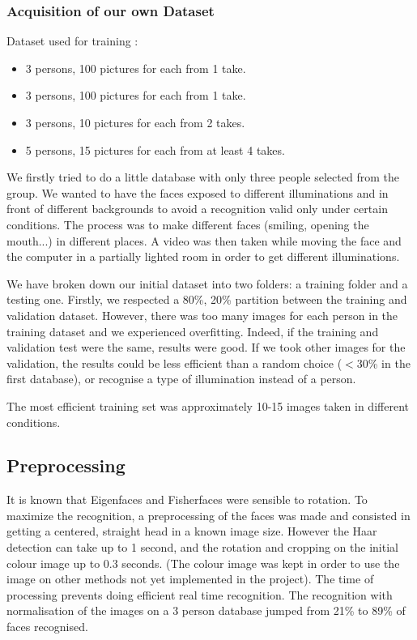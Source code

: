 \subsubsection{Acquisition of our own Dataset}
Dataset used for training :
\begin{itemize}
 \item 3 persons, 100 pictures for each from 1 take.  
\item 3 persons, 100 pictures for each from 1 take.
\item 3 persons, 10 pictures for each from 2 takes.
\item 5 persons, 15 pictures for each from at least 4 takes.
\end{itemize}
We firstly tried to do a little database with only three people selected from the group. We wanted to have the faces exposed to different illuminations and in front of different backgrounds to avoid a recognition valid only under certain conditions. The process was to make different faces (smiling, opening the mouth...) in different places. A video was then taken while moving the face and the computer in a partially lighted room in order to get different illuminations. 

We have broken down our initial dataset into two folders: a training folder and a testing one. Firstly, we respected a 80\%, 20\% partition between the training and validation dataset. However, there was too many images for each person in the training dataset and we experienced overfitting. Indeed, if the training and validation test were the same, results were good. If we took other images for the validation, the results could be less efficient than a random choice ($<$30\% in the first database), or recognise a type of illumination instead of a person.

The most efficient training set was approximately 10-15 images taken in different conditions. 

\subsection{Preprocessing}
\label{Implementation:preprocessing}
It is known that Eigenfaces and Fisherfaces were sensible to rotation. To maximize the recognition, a preprocessing of the faces was made and consisted in getting a centered, straight head in a known image size. However the Haar detection can take up to 1 second, and the rotation and cropping on the initial colour image up to 0.3 seconds. (The colour image was kept in order to use the image on other methods not yet implemented in the project). The time of processing prevents doing efficient real time recognition. The recognition with normalisation of the images on a 3 person database jumped from 21\% to 89\% of faces recognised.

